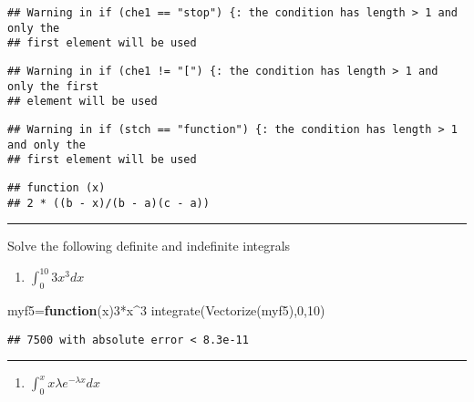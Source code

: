 \documentclass[
]{article}
\newenvironment{Shaded}{\begin{snugshade}}{\end{snugshade}}
\newcommand{\ControlFlowTok}[1]{\textcolor[rgb]{0.13,0.29,0.53}{\textbf{#1}}}
\newcommand{\DecValTok}[1]{\textcolor[rgb]{0.00,0.00,0.81}{#1}}
\newcommand{\FunctionTok}[1]{\textcolor[rgb]{0.00,0.00,0.00}{#1}}
\newcommand{\NormalTok}[1]{#1}
\newcommand{\OtherTok}[1]{\textcolor[rgb]{0.56,0.35,0.01}{#1}}
\newcommand{\SpecialCharTok}[1]{\textcolor[rgb]{0.00,0.00,0.00}{#1}}
\providecommand{\tightlist}{%
  \setlength{\itemsep}{0pt}\setlength{\parskip}{0pt}}
\begin{document}
\begin{verbatim}
## Warning in if (che1 == "stop") {: the condition has length > 1 and only the
## first element will be used
\end{verbatim}

\begin{verbatim}
## Warning in if (che1 != "[") {: the condition has length > 1 and only the first
## element will be used
\end{verbatim}

\begin{verbatim}
## Warning in if (stch == "function") {: the condition has length > 1 and only the
## first element will be used
\end{verbatim}

\begin{verbatim}
## function (x) 
## 2 * ((b - x)/(b - a)(c - a))
\end{verbatim}

\begin{center}\rule{0.5\linewidth}{0.5pt}\end{center}

Solve the following definite and indefinite integrals

\begin{enumerate}
\def\labelenumi{\arabic{enumi}.}
\setcounter{enumi}{4}
\tightlist
\item
  \(\int_0^{10} 3x^3dx\)
\end{enumerate}

\begin{Shaded}
\begin{Highlighting}[]
\NormalTok{myf5}\OtherTok{=}\ControlFlowTok{function}\NormalTok{(x)}\DecValTok{3}\SpecialCharTok{*}\NormalTok{x}\SpecialCharTok{\^{}}\DecValTok{3}
\FunctionTok{integrate}\NormalTok{(}\FunctionTok{Vectorize}\NormalTok{(myf5),}\DecValTok{0}\NormalTok{,}\DecValTok{10}\NormalTok{)}
\end{Highlighting}
\end{Shaded}

\begin{verbatim}
## 7500 with absolute error < 8.3e-11
\end{verbatim}

\begin{center}\rule{0.5\linewidth}{0.5pt}\end{center}

\begin{enumerate}
\def\labelenumi{\arabic{enumi}.}
\setcounter{enumi}{5}
\tightlist
\item
  \(\int_0^x x\lambda e^{−\lambda x}dx\)
\end{enumerate}
\end{document}
